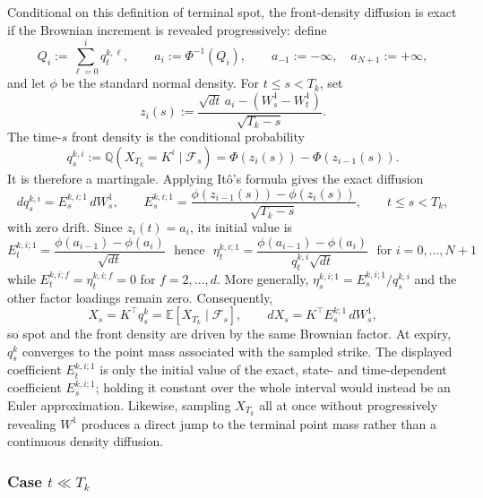 \documentclass[11pt]{article}
\newcommand{\Q}{\mathbb Q}
\theoremstyle{plain}
\theoremstyle{definition}
\theoremstyle{remark}
\begin{document}
  Conditional on this definition of terminal spot, the front-density
  diffusion is exact if the Brownian increment is revealed progressively:
  define
  \[
    Q_i:=\sum_{\ell=0}^i q_t^{k,\ell},
    \qquad
    a_i:=\Phi^{-1}(Q_i),
    \qquad
    a_{-1}:=-\infty,\quad a_{N+1}:=+\infty,
  \]
  and let $\phi$ be the standard normal density. For $t\leq s<T_k$, set
  \[
    z_i(s):=
      \frac{\sqrt{dt}\,a_i-(W_s^1-W_t^1)}{\sqrt{T_k-s}}.
  \]
  The time-$s$ front density is the conditional probability
  \begin{equation}
    \label{eq:front_density_mw}
    q_s^{k,i}
      :=\Q\!\left(X_{T_k}=K^i\mid\mathcal F_s\right)
      =\Phi\!\left(z_i(s)\right)
       -\Phi\!\left(z_{i-1}(s)\right).
  \end{equation}
  It is therefore a martingale. Applying It\^o's formula gives the exact
  diffusion
  \begin{equation}
    \label{eq:front_absolute_vol_mw}
    dq_s^{k,i}=E_s^{k,i;1}\,dW_s^1,
    \qquad
    E_s^{k,i;1}
      =\frac{\phi(z_{i-1}(s))-\phi(z_i(s))}{\sqrt{T_k-s}},
    \qquad t\leq s<T_k,
  \end{equation}
  with zero drift. Since $z_i(t)=a_i$, its initial value is
  \begin{equation}
    E_t^{k,i;1}
      =\frac{\phi(a_{i-1})-\phi(a_i)}{\sqrt{dt}} \ \ \ \mbox{hence} \ \ \
    \eta_t^{k,i;1}
      =\frac{\phi(a_{i-1})-\phi(a_i)}{q_t^{k,i}\sqrt{dt}}
      \ \ \ \mbox{for $i=0,\ldots,N+1$}
  \end{equation}
  while $E_t^{k,i;f}=\eta_t^{k,i;f}=0$ for $f=2,\ldots,d$.
  More generally, $\eta_s^{k,i;1}=E_s^{k,i;1}/q_s^{k,i}$ and the other
  factor loadings remain zero. Consequently,
  \[
    X_s=K^\top q_s^k
      =\mathbb E\!\left[X_{T_k}\mid\mathcal F_s\right],
    \qquad
    dX_s=K^\top E_s^{k;1}\,dW_s^1,
  \]
  so spot and the front density are driven by the same Brownian factor. At
  expiry, $q_s^k$ converges to the point mass associated with the sampled
  strike. The displayed coefficient $E_t^{k,i;1}$ is only the initial value
  of the exact, state- and time-dependent coefficient $E_s^{k,i;1}$; holding
  it constant over the whole interval would instead be an Euler
  approximation. Likewise, sampling $X_{T_k}$ all at once without
  progressively revealing $W^1$ produces a direct jump to the terminal point
  mass rather than a continuous density diffusion.






  \subsubsection*{Case $t\ll T_k$}
\end{document}

